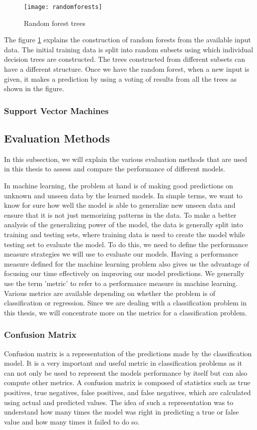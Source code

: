 \documentclass[11pt,openright]{report}
\begin{document}
  \begin{figure}
	\centering
	\texttt{[image: randomforests]}
	\caption{Random forest trees}
	\label{fig:random_forest_trees}
\end{figure} 

The figure \ref{fig:random_forest_trees} explains the construction of random forests from the available input data. The initial training data is split into random subsets using which individual decision trees are constructed. The trees constructed from different subsets can have a different structure. Once we have the random forest, when a new input is given, it makes a prediction by using a voting of results from all the trees as shown in the figure.

\subsubsection {Support Vector Machines }

\subsection {Evaluation Methods}
In this subsection, we will explain the various evaluation methods that are used in this thesis to assess and compare the performance of different models.

In machine learning, the problem at hand is of making good predictions on unknown and unseen data by the learned models. In simple terms, we want to know for sure how well the model is able to generalize new unseen data and ensure that it is not just memorizing patterns in the data. To make a better analysis of the generalizing power of the model, the data is generally split into training and testing sets, where training data is used to create the model while testing set to evaluate the model. To do this, we need to define the performance measure strategies we will use to evaluate our models. Having a performance measure defined for the machine learning problem also gives us the advantage of focusing our time effectively on improving our model predictions. We generally use the term 'metric' to refer to a performance measure in machine learning. Various metrics are available depending on whether the problem is of  classification or regression. Since we are dealing with a classification problem in this thesis, we will concentrate more on the metrics for a classification problem.

\subsubsection {Confusion Matrix}
Confusion matrix is a representation of the predictions made by the classification model. It is a very important and useful metric in classification problems as it can not only be used to represent the models performance by itself but can also compute other metrics. A confusion matrix is composed of statistics such as true positives, true negatives, false positives, and false negatives, which are calculated using actual and predicted values. The idea of such a representation was to understand how many times the model was right in predicting a true or false value and how many times it failed to do so.
\end{document}
